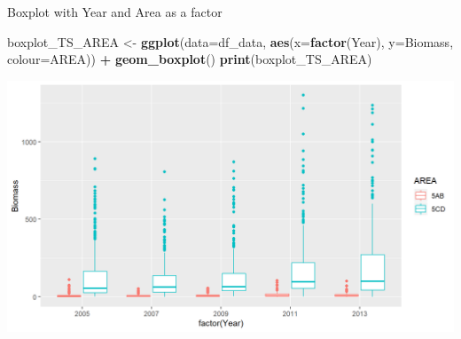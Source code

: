 \documentclass[
  ignorenonframetext,
]{beamer}
\newenvironment{Shaded}{\begin{snugshade}}{\end{snugshade}}
\newcommand{\DataTypeTok}[1]{\textcolor[rgb]{0.13,0.29,0.53}{#1}}
\newcommand{\KeywordTok}[1]{\textcolor[rgb]{0.13,0.29,0.53}{\textbf{#1}}}
\newcommand{\NormalTok}[1]{#1}
\newcommand{\OperatorTok}[1]{\textcolor[rgb]{0.81,0.36,0.00}{\textbf{#1}}}
\newcommand{\StringTok}[1]{\textcolor[rgb]{0.31,0.60,0.02}{#1}}
\begin{document}
\begin{frame}[fragile]{Boxplot with Year and Area as a factor}
\protect\hypertarget{boxplot-with-year-and-area-as-a-factor}{}

\begin{Shaded}
\begin{Highlighting}[]
\NormalTok{boxplot_TS_AREA <-}\StringTok{ }\KeywordTok{ggplot}\NormalTok{(}\DataTypeTok{data=}\NormalTok{df_data, }\KeywordTok{aes}\NormalTok{(}\DataTypeTok{x=}\KeywordTok{factor}\NormalTok{(Year), }\DataTypeTok{y=}\NormalTok{Biomass, }
                                            \DataTypeTok{colour=}\NormalTok{AREA)) }\OperatorTok{+}
\StringTok{  }\KeywordTok{geom_boxplot}\NormalTok{()}
\KeywordTok{print}\NormalTok{(boxplot_TS_AREA)}
\end{Highlighting}
\end{Shaded}

\begin{center}\includegraphics[width=0.8\linewidth]{figure/boxplot_TSf_AREA-1} \end{center}

\end{frame}
\end{document}
